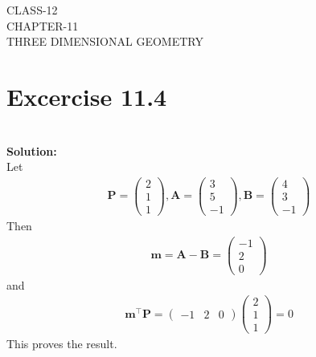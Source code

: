\documentclass[12pt]{article}
\newcommand{\solution}{\noindent \textbf{Solution: }}
\newcommand{\myvec}[1]{\ensuremath{\begin{pmatrix}#1\end{pmatrix}}}
\let\vec\mathbf
\begin{document}
\begin{center}
\textbf\large{CLASS-12 \\ CHAPTER-11 \\ THREE DIMENSIONAL GEOMETRY}
\end{center}
\section*{Excercise 11.4}

\\
\solution
\\
\fi
Let
\begin{align}
  \vec{P}=\myvec{2\\1\\1},\vec{A}=\myvec{3\\5\\-1},\vec{B}=\myvec{4\\3\\-1}
\end{align}
Then
		\begin{align}
	\vec{m}=\vec{A}-\vec{B}=\myvec{-1\\2\\0}
		\end{align}
		and
		\begin{align}
			\vec{m}^\top\vec{P}=
			\myvec{-1&2&0}\myvec{2\\1\\1}=0
		\end{align}
		This proves the result.
\end{document}
